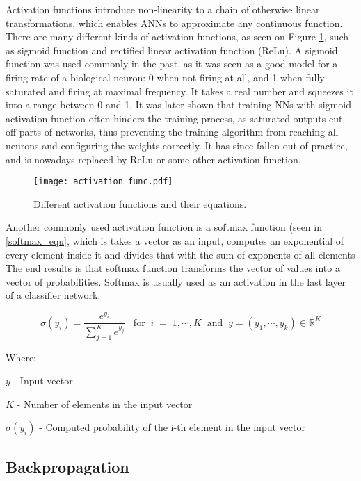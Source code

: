 Activation functions introduce non-linearity to a chain of otherwise linear transformations, which enables ANNs to approximate any continuous function\cite{geron}.
There are many different kinds of activation functions, as seen on Figure \ref{activation_functions}, such as sigmoid function and rectified linear activation function (ReLu).
A sigmoid function was used commonly in the past, as it was seen as a good model for a firing rate of a biological neuron: 0 when not firing at all, and 1 when fully saturated and firing at maximal frequency\cite{cs231n}.
It takes a real number and squeezes it into a range between 0 and 1.
It was later shown that training NNs with sigmoid activation function often hinders the training process, as saturated outputs cut off parts of networks, thus preventing the training algorithm from reaching all neurons and configuring the weights correctly\cite{cs231n}.
It has since fallen out of practice, and is nowadays replaced by ReLu or some other activation function.

\begin{figure}[ht!]
        \centering
        \texttt{[image: activation\_func.pdf]} 
        \caption{Different activation functions and their equations.}
        \label{activation_functions}
\end{figure}


Another commonly used activation function is a softmax function (seen in \ref{softmax_equ}, which is takes a vector as an input, computes an exponential of every element inside it and divides that with the sum of exponents of all elements\cite{geron}
The end results is that softmax function transforms the vector of values into a vector of probabilities.
Softmax is usually used as an activation in the last layer of a classifier network. 

\begin{equation}\label{softmax_equ}
    \sigma(y_i) = \frac{e^{y_i}}{\sum_{j=1}^{K}e^{y_j}}\;\;\;\text{for}\;\;i\;=\;1,\cdots,K\;\;\text{and}\;\;y=(y_1,\cdots,y_k)\in\mathbb{R}^K
\end{equation}

Where:

$y$ - Input vector

$K$ - Number of elements in the input vector

$\sigma(y_i)$ - Computed probability of the i-th element in the input vector 


\subsection{ Backpropagation}

